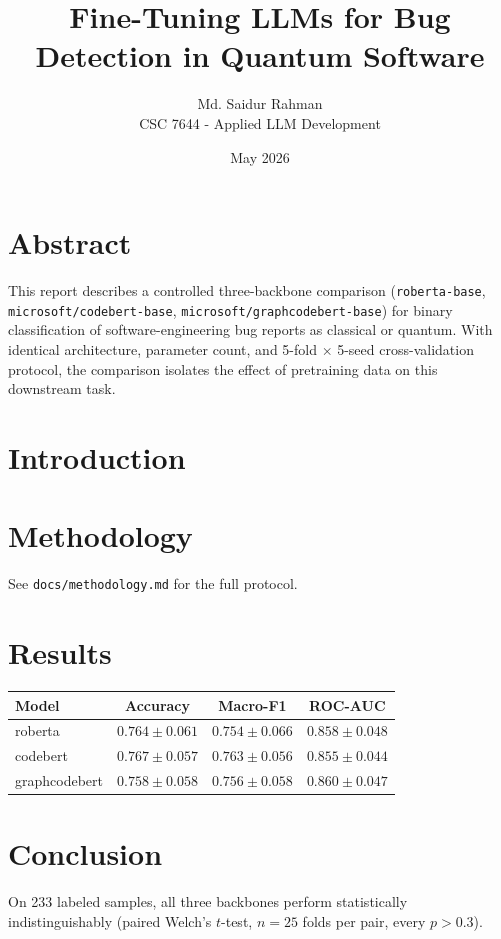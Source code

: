 \documentclass[11pt]{article}
\title{Fine-Tuning LLMs for Bug Detection in Quantum Software}
\author{Md. Saidur Rahman\\CSC 7644 - Applied LLM Development}
\date{May 2026}
\begin{document}
\maketitle

\section*{Abstract}
This report describes a controlled three-backbone comparison
(\texttt{roberta-base}, \texttt{microsoft/codebert-base},
\texttt{microsoft/graphcodebert-base}) for binary classification of
software-engineering bug reports as classical or quantum. With identical
architecture, parameter count, and 5-fold $\times$ 5-seed cross-validation
protocol, the comparison isolates the effect of pretraining data on
this downstream task.

\section{Introduction}

\section{Methodology}
See \texttt{docs/methodology.md} for the full protocol.

\section{Results}

\begin{tabular}{lccc}
\hline
Model & Accuracy & Macro-F1 & ROC-AUC \\
\hline
roberta       & $0.764 \pm 0.061$ & $0.754 \pm 0.066$ & $0.858 \pm 0.048$ \\
codebert      & $0.767 \pm 0.057$ & $0.763 \pm 0.056$ & $0.855 \pm 0.044$ \\
graphcodebert & $0.758 \pm 0.058$ & $0.756 \pm 0.058$ & $0.860 \pm 0.047$ \\
\hline
\end{tabular}

\section{Conclusion}
On 233 labeled samples, all three backbones perform statistically
indistinguishably (paired Welch's $t$-test, $n=25$ folds per pair, every
$p > 0.3$).
\end{document}
